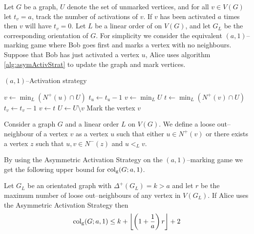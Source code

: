 \begin{definition} 
    Let $G$ be a graph, $U$ denote the set of unmarked vertices, and for all $v\in V(G)$ let $t_v=a$, track the number of activations of $v$. If $v$ has been activated $a$ times then $v$ will have $t_v=0$. Let $L$ be a linear order of on $V(G)$, and let $G_L$ be the corresponding orientation of $G$. %
    For simplicity we consider the equivalent $(a,1)$--marking game where Bob goes first and marks a vertex with no neighbours. Suppose that Bob has just activated a vertex $u$, Alice uses algorithm \ref{alg:asymActivStrat} to update the graph and mark vertices.
    \begin{algorithm}[h]
        \caption{$(a,1)$--Activation strategy}
        \label{alg:asymActivStrat}
        \begin{algorithmic}[1]
            \Statex
                    \State $v\gets \min_L (N^+(u)\cap U)$ %
                    \State $t_u \gets t_u-1$
                    \Else 
                    \State $v\gets \min_L U$                  
                \EndIf
                    \State $t\gets \min_L (N^+(v)\cap U)$ %
                    \State $t_v \gets t_v-1$
                    \State $v\gets t$
                \EndWhile
                \State $U \gets U \setminus v$
                \State Mark the vertex $v$
            \EndFor
        \end{algorithmic}
    \end{algorithm}
\end{definition}

    Consider a graph $G$ and a linear order $L$ on $V(G)$. We define a loose out--neighbour of a vertex $v$ as a vertex $u$ such that either $u\in N^+(v)$ or there exists a vertex $z$ such that $u,v\in N^-(z)$ and $u<_L v$. 
    
    By using the Asymmetric Activation Strategy on the $(a,1)$--marking game we get the following upper bound for $\operatorname{col_g}(G;a,1)$.

\begin{theorem}  %
    Let $G_L$ be an orientated graph with $\Delta^+(G_L)=k>a$ and let $r$ be the maximum number of loose out--neighbours of any vertex in $V(G_L)$. If Alice uses the Asymmetric Activation Strategy then \[\operatorname{col_g}(G;a,1)\leq k+\left\lfloor \left(1+\frac{1}{a}\right)r \right\rfloor +2\]
\end{theorem}

